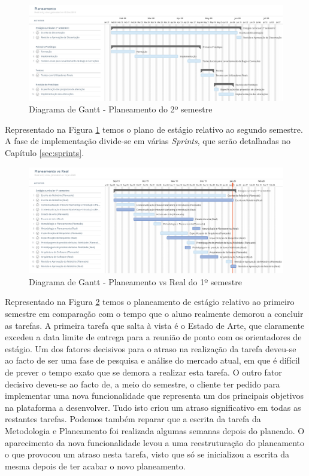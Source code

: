 \begin{figure}[ht!]
	\begin{center}
		\includegraphics[width=1\textwidth]{img/gantt/semestre2.jpeg}
		\caption{Diagrama de Gantt - Planeamento do 2º semestre}
		\label{fig:gantt2}
	\end{center}
\end{figure}

Representado na Figura \ref{fig:gantt2} temos o plano de estágio relativo ao segundo semestre. A fase de implementação divide-se em várias \textit{Sprints}, que serão detalhadas no Capítulo \ref{sec:sprints}.

\newpage

\begin{figure}[ht!]
	\begin{center}
		\includegraphics[width=1\textwidth]{img/gantt/vs.jpeg}
		\caption{Diagrama de Gantt - Planeamento vs Real do 1º semestre}
		\label{fig:ganttvs1}
	\end{center}
\end{figure}

Representado na Figura \ref{fig:ganttvs1} temos o planeamento de estágio relativo ao primeiro semestre em comparação com o tempo que o aluno realmente demorou a concluir as tarefas. A primeira tarefa que salta à vista é o Estado de Arte, que claramente excedeu a data limite de entrega para a reunião de ponto com os orientadores de estágio. Um dos fatores decisivos para o atraso na realização da tarefa deveu-se ao facto de ser uma fase de pesquisa e análise do mercado atual, em que é difícil de prever o tempo exato que se demora a realizar esta tarefa. O outro fator decisivo deveu-se ao facto de, a meio do semestre, o cliente ter pedido para implementar uma nova funcionalidade que representa um dos principais objetivos na plataforma a desenvolver. Tudo isto criou um atraso significativo em todas as restantes tarefas. Podemos também reparar que a escrita da tarefa da Metodologia e Planeamento foi realizada algumas semanas depois do planeado. O aparecimento da nova funcionalidade levou a uma reestruturação do planeamento o que provocou um atraso nesta tarefa, visto que só se inicializou a escrita da mesma depois de ter acabar o novo planeamento.


